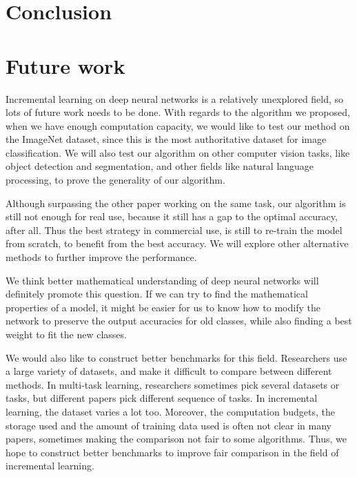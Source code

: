 

\chapter{Conclusion}

\chapter{Future work}
Incremental learning on deep neural networks is a relatively unexplored field, so lots of future work needs to be done. With regards to the algorithm we proposed, when we have enough computation capacity, we would like to test our method on the ImageNet dataset, since this is the most authoritative dataset for image classification. We will also test our algorithm on other computer vision tasks, like object detection and segmentation, and other fields like natural language processing, to prove the generality of our algorithm.

Although surpassing the other paper working on the same task, our algorithm is still not enough for real use, because it still has a gap to the optimal accuracy, after all. Thus the best strategy in commercial use, is still to re-train the model from scratch, to benefit from the best accuracy. We will explore other alternative methods to further improve the performance. 

We think better mathematical understanding of deep neural networks will definitely promote this question. If we can try to find the mathematical properties of a model, it might be easier for us to know how to modify the network to preserve the output accuracies for old classes, while also finding a best weight to fit the new classes.

We would also like to construct better benchmarks for this field. Researchers use a large variety of datasets, and make it difficult to compare between different methods. In multi-task learning, researchers sometimes pick several datasets or tasks, but different papers pick different sequence of tasks. In incremental learning, the dataset varies a lot too. Moreover, the computation budgets, the storage used and the amount of training data used is often not clear in many papers, sometimes making the comparison not fair to some algorithms. Thus, we hope to construct better benchmarks to improve fair comparison in the field of incremental learning.


